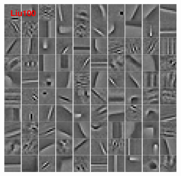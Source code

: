 \begin{figure}[h]
\begin{minipage}{0.4\textwidth}
\begin{subfigure}{1\textwidth}
    \centering
  \includegraphics[width=0.6\linewidth]{figure/liu100-filter.pdf}
  \vspace*{2mm}
\end{subfigure}


\end{minipage}
\end{figure}
